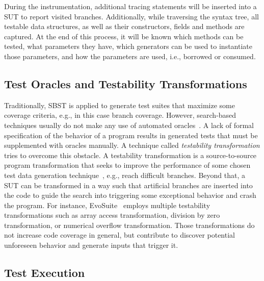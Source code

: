 \documentclass{article}
\begin{document}
During the instrumentation, additional tracing statements will be inserted into a \ac{SUT} to report visited branches. Additionally, while traversing the syntax tree, all testable data structures, as well as their constructors, fields and methods are captured. At the end of this process, it will be known which methods can be tested, what parameters they have, which generators can be used to instantiate those parameters, and how the parameters are used, i.e., borrowed or consumed. 

\subsection{Test Oracles and Testability Transformations}
Traditionally, \ac{SBST} is applied to generate test suites that maximize some coverage criteria, e.g., in this case branch coverage. However, search-based techniques usually do not make any use of automated oracles~\cite{Fraser2013}. A lack of formal specification of the behavior of a program results in generated tests that must be supplemented with oracles manually. A technique called \textit{testability transformation} tries to overcome this obstacle. A testability transformation is a source-to-source program transformation that seeks to improve the performance of some chosen test data generation technique~\cite{Harman2004}, e.g., reach difficult branches. Beyond that, a \ac{SUT} can be transformed in a way such that artificial branches are inserted into the code to guide the search into triggering some exceptional behavior and crash the program. For instance, EvoSuite~\cite{Fraser2013} employs multiple testability transformations such as array access transformation, division by zero transformation, or numerical overflow transformation. Those transformations do not increase code coverage in general, but contribute to discover potential unforeseen behavior and generate inputs that trigger it.

\subsection{Test Execution}
\end{document}

